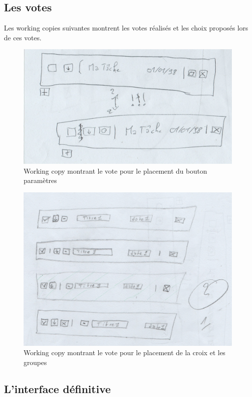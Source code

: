 \documentclass[11pt]{article}
\begin{document}
\subsection{Les votes}
\label{ann:votes}

Les working copies suivantes montrent les votes réalisés et les choix
proposés lors de ces votes.

\begin{figure}[H]
  \centering
  \includegraphics[width=12cm]{img/paramvote.jpg}
  \caption{Working copy montrant le vote pour le placement du bouton paramètres}
  \label{fig:paramvote}
\end{figure}

\begin{figure}[H]
  \centering
  \includegraphics[width=12cm]{img/croixgroupevote.jpg}
  \caption{Working copy montrant le vote pour le placement de la croix
    et les groupes}
  \label{fig:croixgroupevote}
\end{figure}

\subsection{L'interface définitive}
\label{ann:interfacedef}
\end{document}
